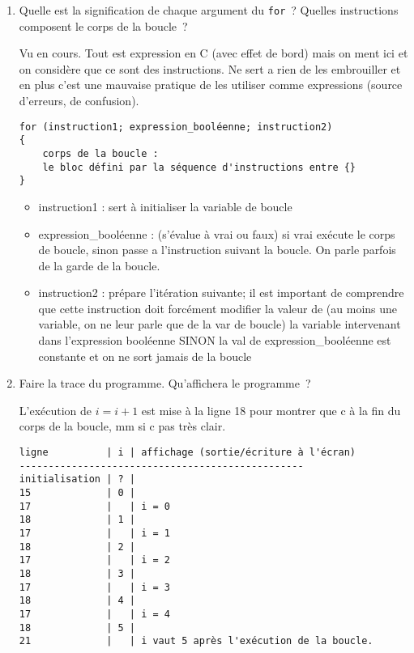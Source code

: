 \begin{enumerate}
\item Quelle est la signification de chaque argument du \verb|for|~?
  Quelles instructions composent le corps de la boucle~?
  \begin{correction}
    Vu en cours. Tout est expression en C (avec effet de bord) mais on
    ment ici et on considère que ce sont des instructions. Ne sert a
    rien de les embrouiller et en plus c'est une mauvaise pratique de les
    utiliser comme expressions (source d'erreurs, de confusion).
\begin{verbatim}
for (instruction1; expression_booléenne; instruction2)
{
    corps de la boucle :
    le bloc défini par la séquence d'instructions entre {}
}
\end{verbatim}
    \begin{itemize}
    \item instruction1 : sert à initialiser la variable de boucle

    \item expression\_booléenne : (s'évalue à vrai ou faux) si vrai
      exécute le corps de boucle, sinon passe a l'instruction suivant
      la boucle. On parle parfois de la garde de la boucle.

    \item instruction2 : prépare l'itération suivante; il est
      important de comprendre que cette instruction doit forcément
      modifier la valeur de (au moins une variable, on ne leur parle
      que de la var de boucle) la variable intervenant dans
      l'expression booléenne SINON la val de expression\_booléenne est
      constante et on ne sort jamais de la boucle
    \end{itemize}
  \end{correction}
\item Faire la trace du programme. Qu'affichera le programme~?

\begin{correction}
L'exécution de $i = i + 1$ est mise à la ligne 18 pour montrer que c à
la fin du corps de la boucle, mm si c pas très clair.
\begin{verbatim}
ligne          | i | affichage (sortie/écriture à l'écran)
-------------------------------------------------
initialisation | ? |
15             | 0 |
17             |   | i = 0
18             | 1 |
17             |   | i = 1
18             | 2 |
17             |   | i = 2
18             | 3 |
17             |   | i = 3
18             | 4 |
17             |   | i = 4
18             | 5 |
21             |   | i vaut 5 après l'exécution de la boucle.
\end{verbatim}


\end{correction}
\end{enumerate}
